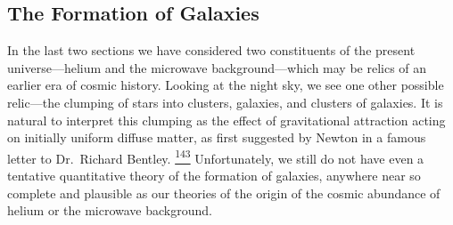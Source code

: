 %

\subsection{The Formation of Galaxies}\label{sec:15.8}

In the last two sections we have considered two constituents of the present
universe---helium and the microwave background---which may be relics of an
earlier era of cosmic history. Looking at the night sky, we see one other
possible relic---the clumping of stars into clusters, galaxies, and clusters
of galaxies. It is natural to interpret this clumping as the effect of
gravitational attraction acting on initially uniform diffuse matter, as first
suggested by Newton in a famous letter to Dr.\ Richard Bentley.%
\hyperref[ch15-ref-143]{\textsuperscript{143}} Unfortunately, we still do
not have even a tentative quantitative theory of the formation of galaxies,
anywhere near so complete and plausible as our theories of the origin of the
cosmic abundance of helium or the microwave background.

